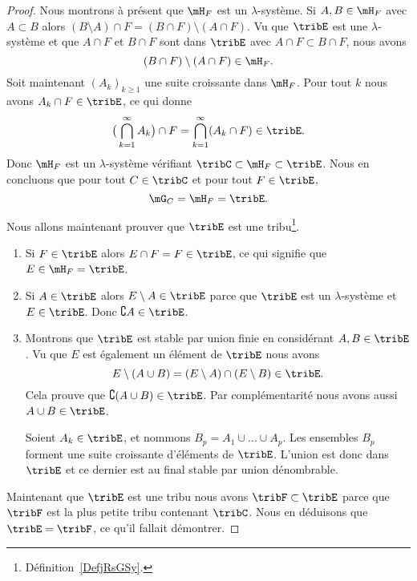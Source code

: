 \begin{proof}
    Nous montrons à présent que \( \mH_F\) est un \( \lambda\)-système. Si \( A,B\in\mH_F\) avec \( A\subset B\) alors \( (B\setminus A)\cap F=(B\cap F)\setminus(A\cap F)\). Vu que \( \tribE\) est une \( \lambda\)-système et que \( A\cap F\) et \( B\cap F\) sont dans \( \tribE\) avec \( A\cap F\subset B\cap F\), nous avons
    \begin{equation}
        (B\cap F)\setminus(A\cap F)\in\mH_F.
    \end{equation}
    Soit maintenant \( (A_k)_{k\geq 1}\) une suite croissante dans \( \mH_F\). Pour tout \( k\) nous avons \( A_k\cap F\in\tribE\), ce qui donne
    \begin{equation}
        \big( \bigcap_{k=1}^{\infty}A_k \big)\cap F=\bigcap_{k=1}^{\infty}(A_k\cap F)\in\tribE.
    \end{equation}
    Donc \( \mH_F\) est un \( \lambda\)-système vérifiant \( \tribC\subset\mH_F\subset\tribE\). Nous en concluons que pour tout \( C\in\tribC\) et pour tout \( F\in\tribE\),
    \begin{equation}
        \mG_C=\mH_F=\tribE.
    \end{equation}

    Nous allons maintenant prouver que \( \tribE\) est une tribu\footnote{Définition~\ref{DefjRsGSy}.}.
    \begin{enumerate}
        \item
            Si \( F\in\tribE\) alors \( E\cap F=F\in\tribE\), ce qui signifie que \( E\in\mH_F=\tribE\).
        \item
            Si \( A\in \tribE\) alors \( E\setminus A\in\tribE\) parce que \( \tribE\) est un \( \lambda\)-système et \( E\in\tribE\). Donc \( \complement A\in\tribE\).
        \item
            Montrons que \( \tribE\) est stable par union finie en considérant \( A,B\in\tribE\). Vu que \( E\) est également un élément de \( \tribE\) nous avons
            \begin{equation}
                E\setminus(A\cup B)=(E\setminus A)\cap(E\setminus B)\in\tribE.
            \end{equation}
            Cela prouve que \( \complement( A\cup B)\in \tribE\). Par complémentarité nous avons aussi \( A\cup B\in\tribE\).

            Soient \( A_k\in\tribE\), et nommons \( B_p=A_1\cup\ldots\cup A_p\). Les ensembles \( B_p\) forment une suite croissante d'éléments de \( \tribE\). L'union est donc dans \( \tribE\) et ce dernier est au final stable par union dénombrable.
    \end{enumerate}

    Maintenant que \( \tribE\) est une tribu nous avons \( \tribF\subset\tribE\) parce que \( \tribF\) est la plus petite tribu contenant \( \tribC\). Nous en déduisons que \( \tribE=\tribF\), ce qu'il fallait démontrer.
\end{proof}

